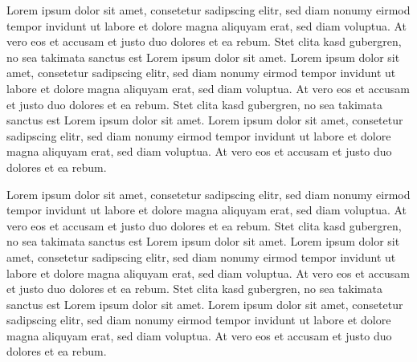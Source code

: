 \documentclass[preprint,journal]{vgtc}       %
\begin{document}
Lorem ipsum dolor sit amet, consetetur sadipscing elitr, sed diam
nonumy eirmod tempor invidunt ut labore et dolore magna aliquyam erat,
sed diam voluptua. At vero eos et accusam et justo duo dolores et ea
rebum. Stet clita kasd gubergren, no sea takimata sanctus est Lorem
ipsum dolor sit amet. Lorem ipsum dolor sit amet, consetetur
sadipscing elitr, sed diam nonumy eirmod tempor invidunt ut labore et
dolore magna aliquyam erat, sed diam voluptua. At vero eos et accusam
et justo duo dolores et ea rebum. Stet clita kasd gubergren, no sea
takimata sanctus est Lorem ipsum dolor sit amet. Lorem ipsum dolor sit
amet, consetetur sadipscing elitr, sed diam nonumy eirmod tempor
invidunt ut labore et dolore magna aliquyam erat, sed diam
voluptua. At vero eos et accusam et justo duo dolores et ea
rebum.

Lorem ipsum dolor sit amet, consetetur sadipscing elitr, sed diam
nonumy eirmod tempor invidunt ut labore et dolore magna aliquyam erat,
sed diam voluptua. At vero eos et accusam et justo duo dolores et ea
rebum. Stet clita kasd gubergren, no sea takimata sanctus est Lorem
ipsum dolor sit amet. Lorem ipsum dolor sit amet, consetetur
sadipscing elitr, sed diam nonumy eirmod tempor invidunt ut labore et
dolore magna aliquyam erat, sed diam voluptua. At vero eos et accusam
et justo duo dolores et ea rebum. Stet clita kasd gubergren, no sea
takimata sanctus est Lorem ipsum dolor sit amet. Lorem ipsum dolor sit
amet, consetetur sadipscing elitr, sed diam nonumy eirmod tempor
invidunt ut labore et dolore magna aliquyam erat, sed diam
voluptua. At vero eos et accusam et justo duo dolores et ea
rebum.


%

%
%
%

\end{document}
